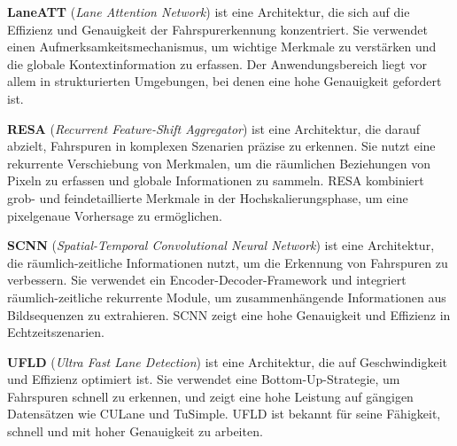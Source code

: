 \documentclass{article}
\begin{document}
                \textbf{LaneATT} (\textit{Lane Attention Network}) ist eine Architektur, die sich auf die Effizienz und Genauigkeit der Fahrspurerkennung konzentriert. Sie verwendet einen Aufmerksamkeitsmechanismus, um wichtige Merkmale zu verstärken und die globale Kontextinformation zu erfassen. Der Anwendungsbereich liegt vor allem in strukturierten Umgebungen, bei denen eine hohe Genauigkeit gefordert ist. 
                \cite{He2021Fast}

                \textbf{RESA} (\textit{Recurrent Feature-Shift Aggregator}) ist eine Architektur, die darauf abzielt, Fahrspuren in komplexen Szenarien präzise zu erkennen. Sie nutzt eine rekurrente Verschiebung von Merkmalen, um die räumlichen Beziehungen von Pixeln zu erfassen und globale Informationen zu sammeln. RESA kombiniert grob- und feindetaillierte Merkmale in der Hochskalierungsphase, um eine pixelgenaue Vorhersage zu ermöglichen.
                \cite{Zheng2020RESA}

                \textbf{SCNN} (\textit{Spatial-Temporal Convolutional Neural Network}) ist eine Architektur, die räumlich-zeitliche Informationen nutzt, um die Erkennung von Fahrspuren zu verbessern. Sie verwendet ein Encoder-Decoder-Framework und integriert räumlich-zeitliche rekurrente Module, um zusammenhängende Informationen aus Bildsequenzen zu extrahieren. SCNN zeigt eine hohe Genauigkeit und Effizienz in Echtzeitszenarien.
                \cite{Li2024Enhanced}

                \textbf{UFLD} (\textit{Ultra Fast Lane Detection}) ist eine Architektur, die auf Geschwindigkeit und Effizienz optimiert ist. Sie verwendet eine Bottom-Up-Strategie, um Fahrspuren schnell zu erkennen, und zeigt eine hohe Leistung auf gängigen Datensätzen wie CULane und TuSimple. UFLD ist bekannt für seine Fähigkeit, schnell und mit hoher Genauigkeit zu arbeiten.
                \cite{Xu2024Exploring}
\end{document}

